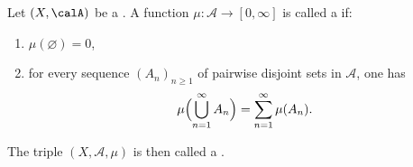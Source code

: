 \begin{definition} \label{definition:measure_on_a_measurable_space_and_measure_space}
    Let $(X, \calA)$ be a .
    A function $\mu : \mathcal{A} \to [0,\infty]$ is called a  if:
    \begin{enumerate}
    \item $\mu(\varnothing) = 0$,
    \item for every sequence $(A_n)_{n\ge 1}$ of pairwise disjoint sets in $\mathcal{A}$, one has
    \[
    \mu\Bigl(\bigcup_{n=1}^\infty A_n\Bigr) = \sum_{n=1}^\infty \mu(A_n).
    \]
    \end{enumerate}
    The triple $(X,\mathcal{A},\mu)$ is then called a .
\end{definition}